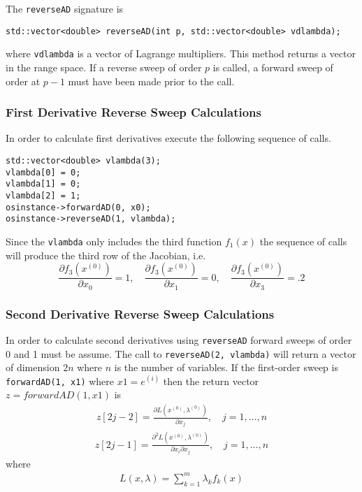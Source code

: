 \documentclass[11pt]{article}
\newcommand{\D}[2]{ \frac{\partial #1}{\partial #2} }
\newcommand{\DD}[3]{ \frac{\partial^2 #1}{\partial #2 \partial #3} }
\renewcommand{\_}{{\char"5F}}
\renewcommand{\{}{{\char"7B}}
\renewcommand{\}}{{\char"7D}}
\renewcommand{\^}{{\char"0D}}
\renewcommand{\'}{{\char"0D}}
\begin{document}
The {\tt reverseAD} signature is
\begin{verbatim}
std::vector<double> reverseAD(int p, std::vector<double> vdlambda);
\end{verbatim}
where {\tt vdlambda} is a vector of Lagrange multipliers.  This method returns a vector in the range space. If a reverse sweep of order $p$ is called, a forward sweep of order at $p -1$ must have been made prior to the call. 

\subsubsection{First Derivative Reverse Sweep Calculations}

In order to calculate first derivatives execute the following sequence of calls. 
\begin{verbatim}
std::vector<double> vlambda(3);
vlambda[0] = 0;
vlambda[1] = 0;
vlambda[2] = 1;
osinstance->forwardAD(0, x0);
osinstance->reverseAD(1, vlambda);
\end{verbatim}
Since the {\tt vlambda} only includes the third function $f_{1}(x)$ the sequence of calls will produce the third row of the Jacobian, i.e.
$$
\D{f_{3}(x^{(0)})}{x_{0}}  = 1,  \quad \D{f_{3}(x^{(0)})}{x_{1}}  = 0, \quad  \D{f_{3}(x^{(0)})}{x_{3}}  = .2 
$$

\subsubsection{Second Derivative Reverse Sweep Calculations}

In order to calculate second derivatives using {\tt reverseAD} forward sweeps of order 0 and 1 must be assume.  The call to {\tt reverseAD(2, vlambda)} will return a vector of dimension $2n$ where $n$ is the number of variables.  If the first-order sweep is {\tt forwardAD(1, x1)} where $x1 = e^{(i)}$ then the return vector $z = forwardAD(1, x1)$ is
\begin{eqnarray}
z[2j - 2]  = \D{L (x^{(0)}, \lambda^{(0)})}{x_{j}}, \quad j = 1, \ldots, n
\end{eqnarray}
\begin{eqnarray}
z[2j - 1]  = \DD{L(x^{(0)}, \lambda^{(0)})}{x_{i}}{x_{j}}, \quad j = 1, \ldots, n
\end{eqnarray}
where
\begin{eqnarray}
L (x, \lambda) = \sum_{k = 1}^{m} \lambda_{k} f_{k}(x)
\end{eqnarray}
\end{document}
